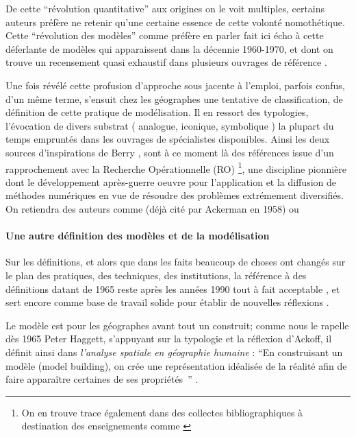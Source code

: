 De cette \enquote{révolution quantitative} aux origines on le voit multiples, certains auteurs préfère ne retenir qu'une certaine essence de cette volonté nomothétique. Cette \enquote{révolution des modèles} comme préfère en parler \textcite{Wilson1970, Varenne2014} fait ici écho à cette déferlante de modèles qui apparaissent dans la décennie 1960-1970, et dont on trouve un recensement quasi exhaustif dans plusieurs ouvrages de référence \autocite{Haggett1965,Chorley1967}.

Une fois révélé cette profusion d'approche sous jacente à l'emploi, parfois confus, d'un même terme, s'ensuit chez les géographes une tentative de classification, de définition de cette pratique de modélisation. Il en ressort des typologies, l'évocation de divers substrat ( analogue, iconique, symbolique ) la plupart du temps empruntés dans les ouvrages de spécialistes disponibles. Ainsi les deux sources d'inspirations de Berry \autocite[106]{Berry1963}, \autocite{Haggett1965} sont à ce moment là des références issue d'un rapprochement avec la Recherche Opérationnelle (RO) \footnote{On en trouve trace également dans des collectes bibliographiques à destination des enseignements comme \autocite{Greer1972}}, une discipline pionnière dont le développement après-guerre oeuvre pour l'application et la diffusion de méthodes numériques en vue de résoudre des problèmes extrémement diversifiés. On retiendra des auteurs comme \textcite{Ackoff1962} (déjà cité par Ackerman en 1958) ou \textcite{Kemeny1962}

\paragraph{Une autre définition des modèles et de la modélisation}

Sur les définitions, et alors que dans les faits beaucoup de choses ont changés sur le plan des pratiques, des techniques, des institutions, la référence à des définitions datant de 1965 reste après les années 1990 tout à fait acceptable \cites{Dastes2001b, Antony2013}[295]{Bailly1995}, et sert encore comme base de travail solide pour établir de nouvelles réflexions \autocite{Brunet2000}. 

Le modèle est pour les géographes avant tout un construit; comme nous le rapelle dès 1965 Peter Haggett, s'appuyant sur la typologie et la réflexion d'Ackoff, il définit ainsi dans \textit{l'analyse spatiale en géographie humaine} : \enquote{En construisant un modèle (model building), on crée une représentation idéalisée de la réalité afin de faire apparaître certaines de ses propriétés } \autocite[30]{Haggett1965}. 

